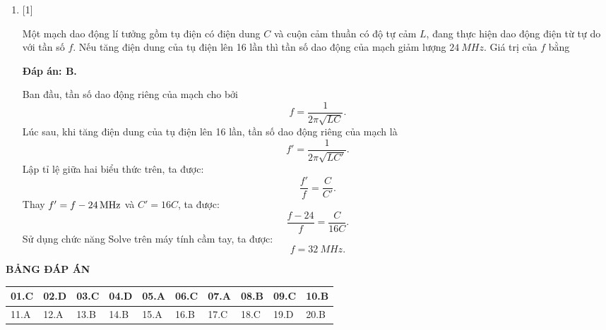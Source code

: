 \begin{enumerate}[label=\bfseries Câu \arabic*:]
	\item {} [1] %
	
	\cauhoi
	{Một mạch dao động lí tưởng gồm tụ điện có điện dung $C$ và cuộn cảm thuần có độ tự cảm $L$, đang thực hiện dao động điện từ tự do với tần số $f$. Nếu tăng điện dung của tụ điện lên 16 lần thì tần số dao động của mạch giảm lượng $\SI{24}{MHz}$. Giá trị của $f$ bằng
	}
	
	\loigiai
	{		\textbf{Đáp án: B.}
		
		Ban đầu, tần số dao động riêng của mạch cho bởi 
		$$f = \dfrac{1}{2\pi \sqrt{LC}}.$$
		Lúc sau, khi tăng điện dung của tụ điện lên 16 lần, tần số dao động riêng của mạch là
		$$f' = \dfrac{1}{2\pi \sqrt{LC'}}.$$
		Lập tỉ lệ giữa hai biểu thức trên, ta được:
		$$\dfrac{f'}{f} = \dfrac{C}{C'}.$$
		Thay $\xsi{f' = f - 24}{MHz}$ và $C' = 16C$, ta được:
		$$\dfrac{f - 24}{f} = \dfrac{C}{16C}.$$
		Sử dụng chức năng Solve trên máy tính cầm tay, ta được:
		$$f = \SI{32}{MHz}.$$
		
	}

\end{enumerate}

\loigiai
{
	\begin{center}
		\textbf{BẢNG ĐÁP ÁN}
	\end{center}
	\begin{center}
		\begin{tabular}{|m{2.8em}|m{2.8em}|m{2.8em}|m{2.8em}|m{2.8em}|m{2.8em}|m{2.8em}|m{2.8em}|m{2.8em}|m{2.8em}|}
			\hline
			01.C  & 02.D  & 03.C  & 04.D  & 05.A  & 06.C  & 07.A &  08.B & 09.C & 10.B \\
			\hline
			11.A  & 12.A  & 13.B  & 14.B  & 15.A  & 16.B  & 17.C &  18.C & 19.D & 20.B \\ 
			\hline
			
		\end{tabular}
	\end{center}
}
